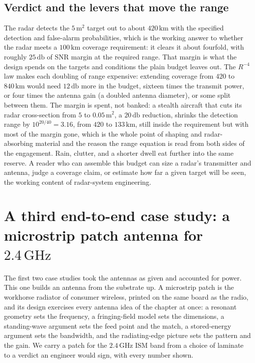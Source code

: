 



\subsection{Verdict and the levers that move the range}

The radar detects the $5\,\si{\meter}^{2}$ target out to about $420\,\si{
\kilo\meter}$ with the specified detection and false-alarm probabilities,
which is the working answer to whether the radar meets a $100\,\si{\kilo
\meter}$ coverage requirement: it clears it about fourfold, with roughly
$25\,\si{\decibel}$ of SNR margin at the required range. That margin is
what the design spends on the targets and conditions the plain budget
leaves out. The $R^{-4}$ law makes each doubling of range expensive:
extending coverage from $420$ to $840\,\si{\kilo\meter}$ would need
$12\,\si{\decibel}$ more in the budget, sixteen times the transmit power,
or four times the antenna gain (a doubled antenna diameter), or some split
between them. The margin is spent, not banked: a stealth aircraft that
cuts its radar cross-section from $5$ to $0.05\,\si{\meter}^{2}$, a
$20\,\si{\decibel}$ reduction, shrinks the detection range by
$10^{20/40} = 3.16$, from $420$ to $133\,\si{\kilo\meter}$, still inside
the requirement but with most of the margin gone, which is the whole point
of shaping and radar-absorbing material and the reason the range equation
is read from both sides of the engagement. Rain, clutter, and a shorter
dwell eat further into the same reserve. A reader who can assemble this budget can size a radar's
transmitter and antenna, judge a coverage claim, or estimate how far a
given target will be seen, the working content of radar-system
engineering.

\section{A third end-to-end case study: a microstrip patch antenna for
$2.4\,\si{\giga\hertz}$}

The first two case studies took the antennas as given and accounted for
power. This one builds an antenna from the substrate up. A microstrip
patch is the workhorse radiator of consumer wireless, printed on the
same board as the radio, and its design exercises every antenna idea of
the chapter at once: a resonant geometry sets the frequency, a
fringing-field model sets the dimensions, a standing-wave argument sets
the feed point and the match, a stored-energy argument sets the
bandwidth, and the radiating-edge picture sets the pattern and the gain.
We carry a patch for the $2.4\,\si{\giga\hertz}$ ISM band from a choice
of laminate to a verdict an engineer would sign, with every number
shown.

